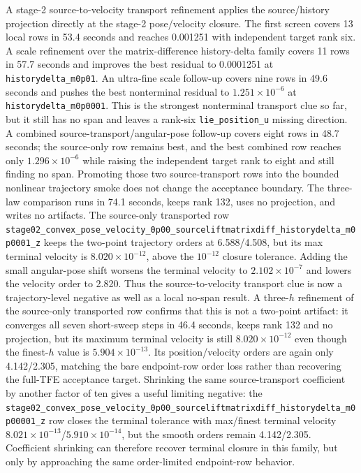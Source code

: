 \documentclass[11pt]{article}
\newcommand{\tfe}{TFE}
\begin{document}
A stage-2 source-to-velocity transport refinement applies the source/history
projection directly at the stage-2 pose/velocity closure.  The first screen
covers 13 local rows in 53.4 seconds and reaches 0.001251 with independent
target rank six.  A scale refinement over the matrix-difference history-delta
family covers 11 rows in 57.7 seconds and improves the best residual to
0.0001251 at \texttt{historydelta\_m0p01}.  An ultra-fine scale follow-up
covers nine rows in 49.6 seconds and pushes the best nonterminal residual to
$1.251\times10^{-6}$ at \texttt{historydelta\_m0p0001}.  This is the strongest
nonterminal transport clue so far, but it still has no span and leaves a
rank-six \nolinkurl{lie_position_u} missing direction.  A combined
source-transport/angular-pose follow-up covers eight rows in 48.7 seconds; the
source-only row remains best, and the best combined row reaches only
$1.296\times10^{-6}$ while raising the independent target rank to eight and
still finding no span.
Promoting those two source-transport rows into the bounded nonlinear trajectory
smoke does not change the acceptance boundary.  The three-law comparison runs
in 74.1 seconds, keeps rank 132, uses no projection, and writes no artifacts.
The source-only transported row
\nolinkurl{stage02_convex_pose_velocity_0p00_sourceliftmatrixdiff_historydelta_m0p0001_z}
keeps the two-point trajectory orders at 6.588/4.508, but its max terminal
velocity is $8.020\times10^{-12}$, above the $10^{-12}$ closure tolerance.
Adding the small angular-pose shift worsens the terminal velocity to
$2.102\times10^{-7}$ and lowers the velocity order to 2.820.  Thus the
source-to-velocity transport clue is now a trajectory-level negative as well
as a local no-span result.
A three-$h$ refinement of the source-only transported row confirms that this
is not a two-point artifact: it converges all seven short-sweep steps in 46.4
seconds, keeps rank 132 and no projection, but its maximum terminal velocity is
still $8.020\times10^{-12}$ even though the finest-$h$ value is
$5.904\times10^{-13}$.  Its position/velocity orders are again only
4.142/2.305, matching the bare endpoint-row order loss rather than recovering
the full-\tfe{} acceptance target.
Shrinking the same source-transport coefficient by another factor of ten gives
a useful limiting negative: the
\nolinkurl{stage02_convex_pose_velocity_0p00_sourceliftmatrixdiff_historydelta_m0p00001_z}
row closes the terminal tolerance with max/finest terminal velocity
$8.021\times10^{-13}$/$5.910\times10^{-14}$, but the smooth orders remain
4.142/2.305.  Coefficient shrinking can therefore recover terminal closure in
this family, but only by approaching the same order-limited endpoint-row
behavior.
\end{document}
